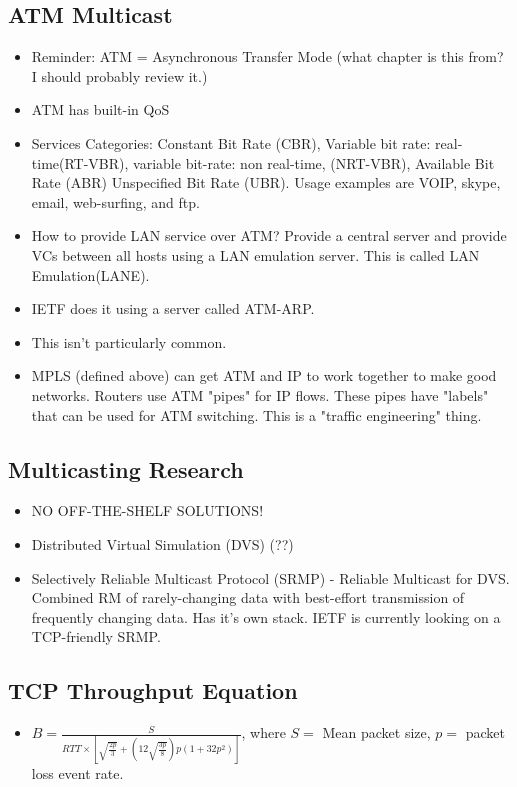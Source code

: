 \documentclass{scrartcl}
\begin{document}
\subsection*{ATM Multicast}
\begin{itemize}
\item Reminder: ATM = Asynchronous Transfer Mode (what chapter is this from?
I should probably review it.)
\item ATM has built-in QoS
\item Services Categories: Constant Bit Rate (CBR), Variable bit rate:
real-time(RT-VBR), variable bit-rate: non real-time, (NRT-VBR), Available Bit
Rate (ABR)
Unspecified Bit Rate (UBR). Usage examples are VOIP, skype, email, web-surfing,
and ftp.
\item How to provide LAN service over ATM? Provide a central server and provide
VCs between all hosts using a LAN emulation server. This is called LAN
Emulation(LANE).
\item IETF does it using a server called ATM-ARP.
\item This isn't particularly common.
\item MPLS (defined above) can get ATM and IP to work together to make
good networks. Routers use ATM "pipes" for IP flows. These pipes have "labels"
that can be used for ATM switching. This is a "traffic engineering" thing.
\end{itemize}
\subsection*{Multicasting Research}
\begin{itemize}
\item NO OFF-THE-SHELF SOLUTIONS!
\item Distributed Virtual Simulation (DVS) (??)
\item Selectively Reliable Multicast Protocol (SRMP) - Reliable Multicast for
DVS. Combined RM of rarely-changing data with best-effort transmission of
frequently changing data. Has it's own stack. IETF is currently looking on a
TCP-friendly SRMP.
\end{itemize}
\subsection*{TCP Throughput Equation}
\begin{itemize}
\item $B = \frac{S}{RTT \times [\sqrt{\frac{2p}{3}} +
(12\sqrt{\frac{3p}{8}})p(1+32p^2)]}$,
where $S =$ Mean packet size, $p =$ packet loss event rate.
\end{itemize}
\end{document}
